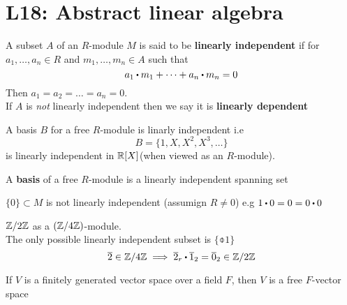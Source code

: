 \documentclass[../Main.tex]{subfiles}
\begin{document}
\chapter{L18: Abstract linear algebra}
\begin{dfn}
	A subset $A$ of an $R$-module $M$ is said to be \textbf{linearly independent} if for $a_1,\dots,a_n\in R$ and $m_1,\dots,m_n\in A$ such that
	\[a_1\rdot m_1+\dots+a_n\rdot m_n=0\]
	Then $a_1=a_2=\dots=a_n=0$.\\
	If $A$ is \textit{not} linearly independent then we say it is \textbf{linearly dependent}
\end{dfn}
\begin{example}
	A basis $B$ for a free $R$-module is linarly independent i.e
	\[B = \{1,X,X^2,X^3,\dots\}\]
	is linearly independent in $\mathbb{R}[X]$(when viewed as an $R$-module).
\end{example}
\begin{dfn}
	A \textbf{basis} of a free $R$-module is a linearly independent spanning set
\end{dfn}
\begin{example}
	$\{0\}\subset M$ is not linearly independent (assumign $R\ne 0$) e.g $1\rdot 0=0=0\rdot 0$
\end{example}
\begin{example}
	$\mathbb{Z}/2\mathbb{Z}$ as a $(\mathbb{Z}/4\mathbb{Z})$-module.\\
	The only possible linearly independent subset is $\{\obar{1}\}$
	\[\obar{2}\in \modZ{4} \implies \obar{2}_r\rdot \obar{1}_2=\obar{0}_2\in \modZ{2} \]
\end{example}
\begin{thm}
	If $V$ is a finitely generated vector space over a field $F$, then $V$ is a free $F$-vector space
\end{thm}
\end{document}
